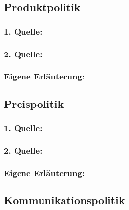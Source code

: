     \subsection{Produktpolitik}
        \subsubsection*{1. Quelle:}
        \begin{abstract}
        \end{abstract}
        \subsubsection*{2. Quelle:}
        \begin{abstract}
        \end{abstract}
        \subsubsection*{Eigene Erläuterung:}
        \begin{abstract}
        \end{abstract}
    \subsection{Preispolitik}
        \subsubsection*{1. Quelle:}
        \begin{abstract}
        \end{abstract}
        \subsubsection*{2. Quelle:}
        \begin{abstract}
        \end{abstract}
        \subsubsection*{Eigene Erläuterung:}
        \begin{abstract}
        \end{abstract}
    \subsection{Kommunikationspolitik}

